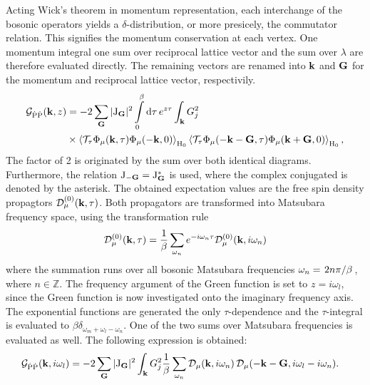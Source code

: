 Acting Wick's theorem in momentum representation, each interchange of the bosonic operators yields a $\delta$-distribution, or more presicely, the  commutator relation.
This signifies the momentum conservation at each vertex.
One momentum integral one sum over reciprocal lattice vector and the sum over $\lambda$ are therefore evaluated directly.
The remaining vectors are renamed into $\vb{k}$ and $\vb{G}$ for the momentum and reciprocal lattice vector, respectivily.
%
%
%
\begin{align}
	\mathcal{G}_{\dot{\mathrm{P}}\dot{\mathrm{P}}}(\vb{k}, z) &= 
		-2 
		\sum\limits_{\vb{G}} 
		\vert \mathrm{J}_{\vb{G}} \vert^{2}
		\int\limits_{0}^{\beta} \dd{\tau} e^{z \tau} 
		\int_{\vb{k}} G_{j}^{2}
		\notag \\
		&\times
		\expval{\mathcal{T}_{\tau} \Phi_{\mu}(\vb{k},\tau) \Phi_{\mu}(-\vb{k},0)}_{\mathrm{H}_{0}} 
		\expval{\mathcal{T}_{\tau} \Phi_{\mu}(-\vb{k} - \vb{G},\tau) \Phi_{\mu}(\vb{k}+\vb{G},0)}_{\mathrm{H}_{0}},
\end{align}
%
The factor of 2 is originated by the sum over both identical diagrams.
Furthermore, the relation $\mathrm{J}_{-\vb{G}} = \mathrm{J}_{\vb{G}}^{*}$ is used, where the complex conjugated is denoted by the asterisk.
The obtained expectation values are the free spin density propagtors $\mathcal{D}_{\mu}^{(0)}(\vb{k},\tau)$.
Both propagators are transformed into Matsubara frequency space, using the transformation rule
%
\begin{align}
	\mathcal{D}_{\mu}^{(0)}(\vb{k},\tau) = \frac{1}{\beta} \sum\limits_{\omega_{n}} e^{-i\omega_{n}\tau} \mathcal{D}_{\mu}^{(0)}(\vb{k},i\omega_{n})
\end{align}
%
where the summation runs over all bosonic Matsubara frequencies $\omega_{n} = \flatfrac{2n\pi}{\beta}$, where $n\in\mathbb{Z}$.
The frequency argument of the Green function is set to $z = i\omega_{l}$, since the Green function is now investigated onto the imaginary frequency axis.
The exponential functions are generated the only $\tau$-dependence and the $\tau$-integral is evaluated to $\beta \delta_{\omega_{m}+\omega_{l}-\omega_{n}}$.
One of the two sums over Matsubara frequencies is evaluated as well.
The following expression is obtained:
%
\begin{align}
	\mathcal{G}_{\dot{\mathrm{P}}\dot{\mathrm{P}}}(\vb{k}, i\omega_{l}) &= 
		-2 
		\sum\limits_{\vb{G}} 
		\vert \mathrm{J}_{\vb{G}} \vert^{2}
		\int_{\vb{k}} G_{j}^{2}
		\frac{1}{\beta} \sum\limits_{\omega_{n}}
		\mathcal{D}_{\mu}(\vb{k},i\omega_{n}) \,
		\mathcal{D}_{\mu}(-\vb{k}-\vb{G},i\omega_{l}-i\omega_{n}).
		\label{appeq:Green function on the imaginary axis}
\end{align}
